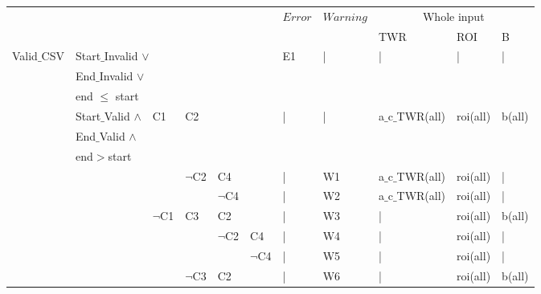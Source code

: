 \documentclass[runningheads,12pt]{article}
\begin{document}










\newpage
\begin{landscape}
\begin{table}

\centering

\begin{tabular}{|l|l|l|l|l|l||l|l|l|l|l|}
\hline
\multicolumn{6}{|c||}{} & $Error$ & $Warning$ & \multicolumn{3}{|c|}{Whole input}\\ 


\multicolumn{6}{|c||}{} & & & TWR & ROI & B\\ 


\hline
Valid$\_$CSV & \multicolumn{5}{|l||}{Start$\_$Invalid $\vee$ } & E1 & | & | & | & |\\ 
& \multicolumn{5}{|l||}{End$\_$Invalid $\vee$}& & & &&\\
& \multicolumn{5}{|l||}{end $\le$ start}& & & &&\\

\cline{2-11}
& Start$\_$Valid  $\wedge$ & C1 & \multicolumn{3}{|l||}{C2} & | & | & a$\_$c$\_$TWR(all) & roi(all) & b(all)\\
& End$\_$Valid $\wedge$& &\multicolumn{3}{|l||}{}&&&&&\\
& end$>$start &&\multicolumn{3}{|l||}{}&&&&&\\

\cline{4-11}
& & & $\lnot$C2 &\multicolumn{2}{|l||}{C4} & | & W1 & a$\_$c$\_$TWR(all) & roi(all) & |\\

\cline{5-11}
& & & &\multicolumn{2}{|l||}{$\lnot$C4} & | & W2 & a$\_$c$\_$TWR(all) & roi(all) & |\\

\cline{3-11}
& & $\lnot$C1 & C3 &\multicolumn{2}{|l||}{C2} & | & W3 & | & roi(all) & b(all)\\

\cline{5-11}
& & & & $\lnot$C2 & C4 & | & W4 & | & roi(all) & |\\

\cline{6-11}
& & & & & $\lnot$C4 & | & W5 & | & roi(all) & |\\

\cline{4-11}
& & & $\lnot$C3 &\multicolumn{2}{|l||}{C2} & | & W6 & | & roi(all) & b(all)\\


\end{tabular}
\end{table}
\end{landscape}
\end{document}
